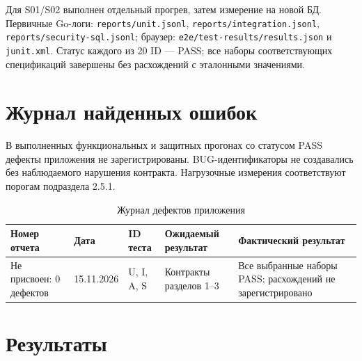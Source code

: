 \documentclass[12pt,a4paper]{extarticle}
\newcommand{\code}[1]{\nolinkurl{#1}}
\newcommand{\mainsection}[1]{\clearpage\section{#1}}
\begin{document}
Для S01/S02 выполнен отдельный прогрев, затем измерение на новой БД.
Первичные Go-логи: \code{reports/unit.jsonl},
\code{reports/integration.jsonl}, \code{reports/security-sql.jsonl};
браузер: \code{e2e/test-results/results.json} и \code{junit.xml}.
Статус каждого из 20 ID --- PASS; все наборы соответствующих
спецификаций завершены без расхождений с эталонными значениями.

\mainsection{Журнал найденных ошибок}
В выполненных функциональных и защитных прогонах со статусом PASS дефекты приложения
не зарегистрированы. BUG-идентификаторы не создавались без наблюдаемого
нарушения контракта. Нагрузочные измерения соответствуют порогам подраздела 2.5.1.

\begin{longtable}{|P{25mm}|P{23mm}|P{20mm}|P{40mm}|P{40mm}|}
\caption{Журнал дефектов приложения}\\\hline
Номер отчета & Дата & ID теста & Ожидаемый результат & Фактический результат \\\hline
Не присвоен: 0 дефектов & 15.11.2026 & U, I, A, S &
Контракты разделов 1--3 & Все выбранные наборы PASS; расхождений не зарегистрировано \\\hline
\end{longtable}



\mainsection{Результаты}
\end{document}
